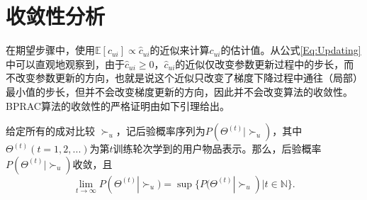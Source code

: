 \section{收敛性分析}\label{Sec:Convergence}
在期望步骤中，使用$\mathbb{E}[c_{ui}] \propto \hat{c}_{ui}$的近似来计算$c_{ui}$的估计值。从公式\eqref{Eq:Updating}中可以直观地观察到，由于$\hat{c}_{ui} \ge 0$，$\hat{c}_{ui}$的近似仅改变参数更新过程中的步长，而不改变参数更新的方向，也就是说这个近似只改变了梯度下降过程中通往（局部）最小值的步长，但并不会改变梯度更新的方向，因此并不会改变算法的收敛性。BPRAC算法的收敛性的严格证明由如下引理给出。
\begin{lemma}\label{Lemma:ConvergenceAnalysis}
给定所有的成对比较 ${\succ _u}$，记后验概率序列为$P(\Theta^{(t)} |\succ_u)$，其中${\Theta ^{(t)}}(t=1,2,...)$为第$t$训练轮次学到的用户物品表示。那么，后验概率${P(\Theta ^{(t)}|\succ_u)}$收敛，且
	\begin{equation}\label{Eq:PosteriorSupremum}
		\mathop {\lim }\limits_{t \to \infty } P({\Theta ^{(t)}}|{ \succ _u}) = \sup \{ P({\Theta ^{(t)}}|{ \succ _u}) | t \in \mathbb{N}\}.
	\end{equation}
\end{lemma}


